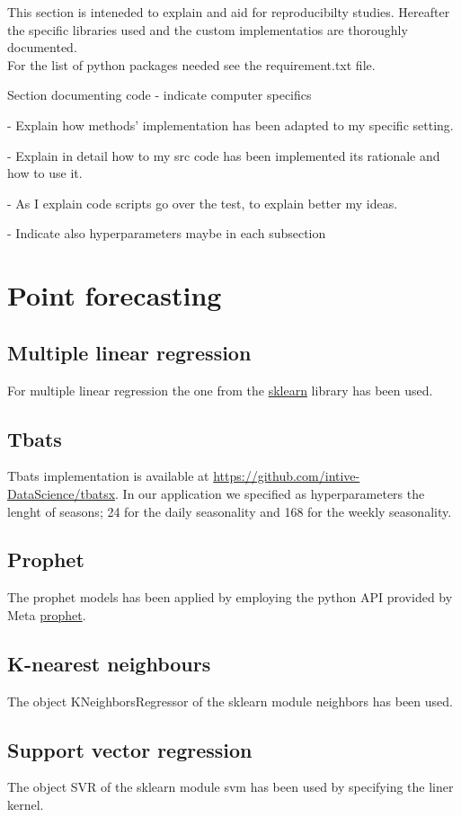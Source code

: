 This section is inteneded to explain and aid for reproducibilty studies. Hereafter the specific libraries used and the custom implementatios are thoroughly documented.
\\
For the list of python packages needed see the requirement.txt file.


Section documenting code
- indicate computer specifics

- Explain how methods' implementation has been
adapted to my specific setting.

- Explain in detail how to my src code has been implemented
its rationale and how to use it.

- As I explain code scripts go over the test, to 
explain better my ideas.

- Indicate also hyperparameters maybe in each subsection

\section{Point forecasting}
\subsection{Multiple linear regression}
For multiple linear regression the one from the \href{https://scikit-learn.org/stable/}{sklearn} library has been used.

\subsection{Tbats}
Tbats implementation is available at \url{https://github.com/intive-DataScience/tbatsx}.
In our application we specified as hyperparameters the lenght of seasons; 24 for the daily seasonality and 168 for the weekly seasonality.

\subsection{Prophet}
The prophet models has been applied by employing the python API provided by Meta \href{https://facebook.github.io/prophet/docs/quick_start.html}{prophet}.

\subsection{K-nearest neighbours}
The object KNeighborsRegressor of the sklearn module neighbors has been used.

\subsection{Support vector regression}
The object SVR of the sklearn module svm has been used by specifying the liner kernel.

